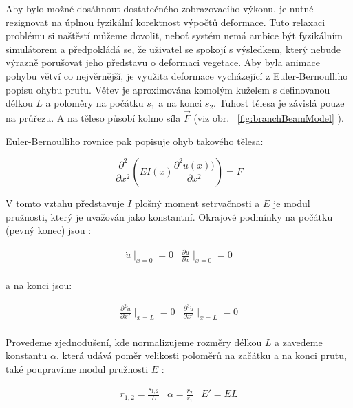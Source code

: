 Aby bylo možné dosáhnout dostatečného zobrazovacího výkonu, je nutné rezignovat na úplnou fyzikální korektnost výpočtů deformace. Tuto relaxaci problému si naštěstí můžeme dovolit, neboť systém nemá ambice být fyzikálním simulátorem a předpokládá se, že uživatel se spokojí s výsledkem, který nebude výrazně porušovat jeho představu o deformaci vegetace.
Aby byla animace pohybu větví co nejvěrnější, je využita deformace vycházející z Euler-Bernoulliho popisu ohybu prutu. Větev je aproximována komolým kuželem s definovanou délkou $L$ a poloměry na počátku $s_1$ a na konci $s_2$. Tuhost tělesa je závislá pouze na průřezu. A na těleso působí kolmo síla $\vec{F}$ (viz obr. ~\ref{fig:branchBeamModel} ).

Euler-Bernoulliho rovnice pak popisuje ohyb takového tělesa:

\begin{equation}
\frac{\partial^2 }{\partial x^2}(EI(x)\frac{\partial^2 \dot{u} (x))}{\partial x^2} ) = F
\end{equation}

V tomto vztahu představuje $I$ plošný moment setrvačnosti a $E$ je modul pružnosti, který je uvažován jako konstantní. Okrajové podmínky na počátku (pevný konec) jsou :

\begin{equation}
\begin{array}{cc}
\dot{u} \mid _{x=0} = 0 & \frac{\partial \dot{u} }{\partial x}\mid _{x=0} = 0 \\
\end{array}
\end{equation}

a na konci jsou:

\begin{equation}
\begin{array}{cc}
\frac{\partial^2 \dot{u} }{\partial x^2} \mid _{x=L} = 0 & \frac{\partial^3 \dot{u} }{\partial x^3}\mid _{x=L} = 0 \\
\end{array}
\end{equation}

Provedeme zjednodušení, kde normalizujeme rozměry délkou $L$ a zavedeme konstantu $\alpha$, která udává poměr velikosti poloměrů na začátku a na konci prutu, také poupravíme modul pružnosti $E$ :

\begin{equation}
\begin{array}{ccc}
r_{1,2} = \frac{s_{1,2}}{L} &\alpha = \frac{r_2}{r_1} & {E}'= EL\\
\end{array}
\end{equation}

